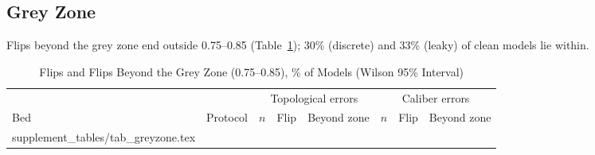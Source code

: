 \documentclass[journal,twoside,web,onecolumn]{ieeecolor}
\begin{document}
\FloatBarrier
{}
\subsection{Grey Zone}\label{sec:grey}
Flips beyond the grey zone end outside 0.75--0.85 (Table~\ref{tab:grey}); 30\% (discrete) and 33\% (leaky) of clean models lie within.
\begin{table}[!ht]
\caption{Flips and Flips Beyond the Grey Zone (0.75--0.85), \% of Models (Wilson 95\% Interval)}\label{tab:grey}
\centering\footnotesize
\begin{tabular}{@{}llrccrcc@{}}
\toprule
 & & \multicolumn{3}{c}{Topological errors} & \multicolumn{3}{c}{Caliber errors}\\
\cmidrule(lr){3-5}\cmidrule(l){6-8}
Bed & Protocol & $n$ & Flip & Beyond zone & $n$ & Flip & Beyond zone\\
\midrule
{} supplement_tables/tab_greyzone.tex 
\bottomrule
\end{tabular}
\end{table}

\FloatBarrier
{}
\end{document}
